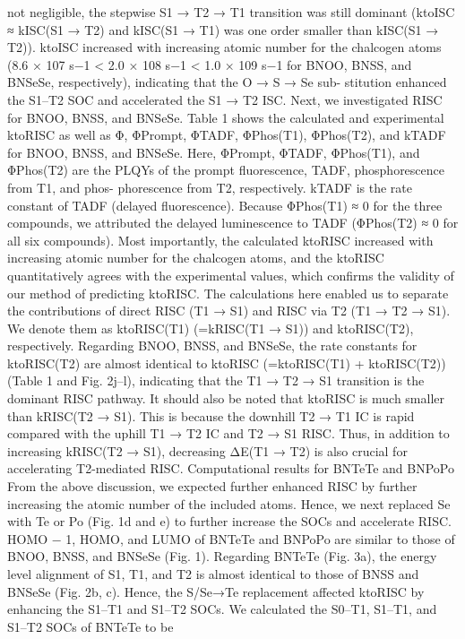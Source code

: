 not negligible, the stepwise S1 → T2 → T1 transition was still dominant
(ktoISC ≈ kISC(S1 → T2) and kISC(S1 → T1) was one order smaller than
kISC(S1 → T2)). ktoISC increased with increasing atomic number for the
chalcogen atoms (8.6 × 107 s−1 < 2.0 × 108 s−1 < 1.0 × 109 s−1 for BNOO,
BNSS, and BNSeSe, respectively), indicating that the O → S → Se sub-
stitution enhanced the S1–T2 SOC and accelerated the S1 → T2 ISC.
Next, we investigated RISC for BNOO, BNSS, and BNSeSe. Table 1
shows the calculated and experimental ktoRISC as well as Φ, ΦPrompt,
ΦTADF, ΦPhos(T1), ΦPhos(T2), and kTADF for BNOO, BNSS, and BNSeSe.
Here, ΦPrompt, ΦTADF, ΦPhos(T1), and ΦPhos(T2) are the PLQYs of the
prompt ﬂuorescence, TADF, phosphorescence from T1, and phos-
phorescence from T2, respectively. kTADF is the rate constant of
TADF (delayed ﬂuorescence). Because ΦPhos(T1) ≈ 0 for the three
compounds, we attributed the delayed luminescence to TADF
(ΦPhos(T2) ≈ 0 for all six compounds). Most importantly, the calculated
ktoRISC increased with increasing atomic number for the chalcogen
atoms, and the ktoRISC quantitatively agrees with the experimental
values, which conﬁrms the validity of our method of predicting ktoRISC.
The calculations here enabled us to separate the contributions of direct
RISC (T1 → S1) and RISC via T2 (T1 → T2 → S1). We denote them as
ktoRISC(T1) (=kRISC(T1 → S1)) and ktoRISC(T2), respectively. Regarding
BNOO, BNSS, and BNSeSe, the rate constants for ktoRISC(T2) are almost
identical to ktoRISC (=ktoRISC(T1) + ktoRISC(T2)) (Table 1 and Fig. 2j–l),
indicating that the T1 → T2 → S1 transition is the dominant RISC pathway.
It should also be noted that ktoRISC is much smaller than kRISC(T2 → S1).
This is because the downhill T2 → T1 IC is rapid compared with the uphill
T1 → T2 IC and T2 → S1 RISC. Thus, in addition to increasing kRISC(T2 → S1),
decreasing ΔE(T1 → T2) is also crucial for accelerating T2-mediated RISC.
Computational results for BNTeTe and BNPoPo
From the above discussion, we expected further enhanced RISC by
further increasing the atomic number of the included atoms. Hence,
we next replaced Se with Te or Po (Fig. 1d and e) to further increase the
SOCs and accelerate RISC. HOMO − 1, HOMO, and LUMO of BNTeTe
and BNPoPo are similar to those of BNOO, BNSS, and BNSeSe (Fig. 1).
Regarding BNTeTe (Fig. 3a), the energy level alignment of S1, T1, and T2
is almost identical to those of BNSS and BNSeSe (Fig. 2b, c). Hence, the
S/Se→Te replacement affected ktoRISC by enhancing the S1–T1 and S1–T2
SOCs. We calculated the S0–T1, S1–T1, and S1–T2 SOCs of BNTeTe to be

